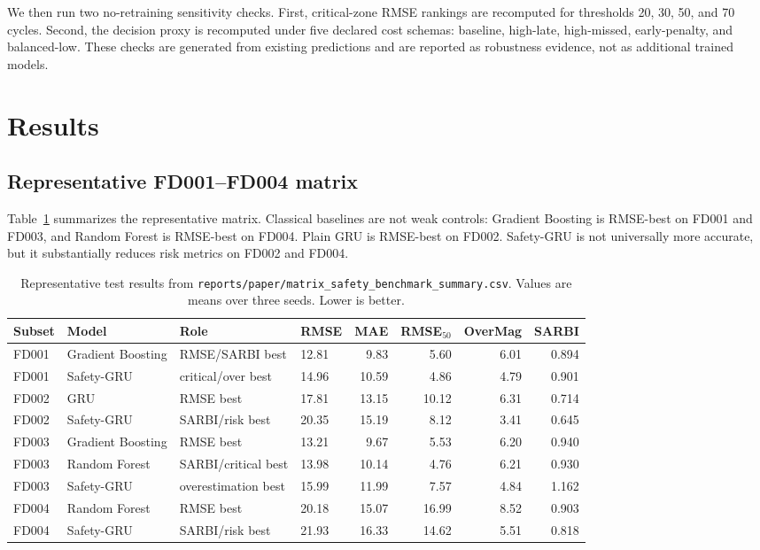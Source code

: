 \documentclass[10pt,twocolumn]{article}
\begin{document}
We then run two no-retraining sensitivity checks. First, critical-zone RMSE rankings are recomputed for thresholds 20, 30, 50, and 70 cycles. Second, the decision proxy is recomputed under five declared cost schemas: baseline, high-late, high-missed, early-penalty, and balanced-low. These checks are generated from existing predictions and are reported as robustness evidence, not as additional trained models.

\section{Results}

\subsection{Representative FD001--FD004 matrix}

Table~\ref{tab:matrix-summary} summarizes the representative matrix. Classical baselines are not weak controls: Gradient Boosting is RMSE-best on FD001 and FD003, and Random Forest is RMSE-best on FD004. Plain GRU is RMSE-best on FD002. Safety-GRU is not universally more accurate, but it substantially reduces risk metrics on FD002 and FD004.

\begin{table}[t]
\centering
\caption{Representative test results from \texttt{reports/paper/matrix\_safety\_benchmark\_summary.csv}. Values are means over three seeds. Lower is better.}
\label{tab:matrix-summary}
\small
\begin{tabular}{llllrrrr}
\toprule
Subset & Model & Role & RMSE & MAE & RMSE$_{50}$ & OverMag & SARBI \\
\midrule
FD001 & Gradient Boosting & RMSE/SARBI best & 12.81 & 9.83 & 5.60 & 6.01 & 0.894 \\
FD001 & Safety-GRU & critical/over best & 14.96 & 10.59 & 4.86 & 4.79 & 0.901 \\
FD002 & GRU & RMSE best & 17.81 & 13.15 & 10.12 & 6.31 & 0.714 \\
FD002 & Safety-GRU & SARBI/risk best & 20.35 & 15.19 & 8.12 & 3.41 & 0.645 \\
FD003 & Gradient Boosting & RMSE best & 13.21 & 9.67 & 5.53 & 6.20 & 0.940 \\
FD003 & Random Forest & SARBI/critical best & 13.98 & 10.14 & 4.76 & 6.21 & 0.930 \\
FD003 & Safety-GRU & overestimation best & 15.99 & 11.99 & 7.57 & 4.84 & 1.162 \\
FD004 & Random Forest & RMSE best & 20.18 & 15.07 & 16.99 & 8.52 & 0.903 \\
FD004 & Safety-GRU & SARBI/risk best & 21.93 & 16.33 & 14.62 & 5.51 & 0.818 \\
\bottomrule
\end{tabular}
\end{table}
\end{document}
